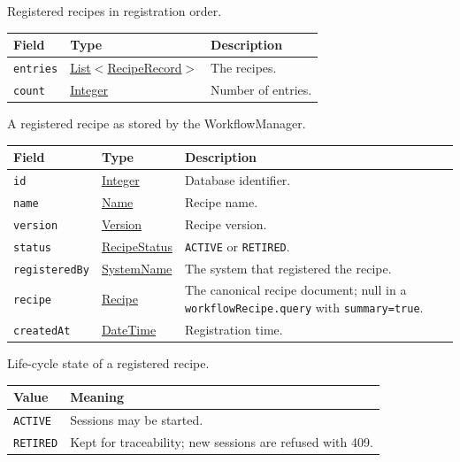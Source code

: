 \documentclass[a4paper]{arrowhead}
\newcommand{\mref}[1]{{\textcolor{ArrowheadPurple}{\hyperref[sec:model:#1]{#1}}}}
\newcommand{\pref}[1]{{\textcolor{ArrowheadGrey}{\hyperref[sec:model:primitives:#1]{#1}}}}
\begin{document}
Registered recipes in registration order.

{\small
\begin{longtable}{|p{3.9cm}|p{4.4cm}|p{7.5cm}|}

\hline
\rowcolor{gray!33} Field & Type & Description \\ \hline
\endhead
\texttt{entries} & \pref{List}$<$\mref{RecipeRecord}$>$ & The recipes. \\ \hline
\texttt{count} & \pref{Integer} & Number of entries. \\ \hline
\end{longtable}
}

A registered recipe as stored by the WorkflowManager.

{\small
\begin{longtable}{|p{3.9cm}|p{4.4cm}|p{7.5cm}|}

\hline
\rowcolor{gray!33} Field & Type & Description \\ \hline
\endhead
\texttt{id} & \pref{Integer} & Database identifier. \\ \hline
\texttt{name} & \pref{Name} & Recipe name. \\ \hline
\texttt{version} & \pref{Version} & Recipe version. \\ \hline
\texttt{status} & \mref{RecipeStatus} & \texttt{ACTIVE} or \texttt{RETIRED}. \\ \hline
\texttt{registeredBy} & \pref{SystemName} & The system that registered the recipe. \\ \hline
\texttt{recipe} & \mref{Recipe} & The canonical recipe document; null in a \texttt{workflow\allowbreak{}Recipe.\allowbreak{}query} with \texttt{summary=true}. \\ \hline
\texttt{createdAt} & \pref{DateTime} & Registration time. \\ \hline
\end{longtable}
}

Life-cycle state of a registered recipe.

{\small
\begin{longtable}{|p{3.9cm}|p{11.9cm}|}

\hline
\rowcolor{gray!33} Value & Meaning \\ \hline
\endhead
\texttt{ACTIVE} & Sessions may be started. \\ \hline
\texttt{RETIRED} & Kept for traceability; new sessions are refused with 409. \\ \hline
\end{longtable}
}
\end{document}

